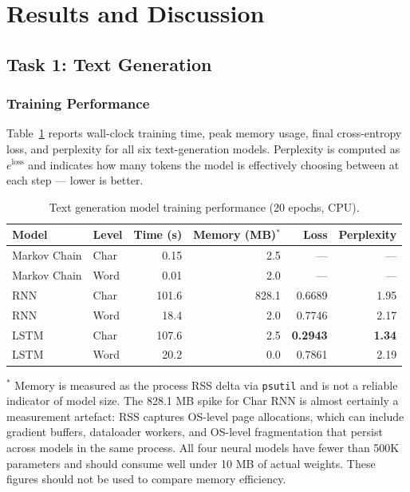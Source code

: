 \section{Results and Discussion}
\label{sec:results}

\subsection{Task 1: Text Generation}

\subsubsection*{Training Performance}

Table~\ref{tab:task1_training} reports wall-clock training time, peak memory usage,
final cross-entropy loss, and perplexity for all six text-generation models.
Perplexity is computed as $e^{\text{loss}}$ and indicates how many tokens the model
is effectively choosing between at each step — lower is better.

\begin{table}[H]
\centering
\caption{Text generation model training performance (20 epochs, CPU).}
\label{tab:task1_training}
\begin{tabular}{llrrrr}
\toprule
\textbf{Model} & \textbf{Level} & \textbf{Time (s)} & \textbf{Memory (MB)}$^*$ & \textbf{Loss} & \textbf{Perplexity} \\
\midrule
Markov Chain & Char & 0.15  & 2.5   & —      & —     \\
Markov Chain & Word & 0.01  & 2.0   & —      & —     \\
RNN          & Char & 101.6 & 828.1 & 0.6689 & 1.95  \\
RNN          & Word & 18.4  & 2.0   & 0.7746 & 2.17  \\
LSTM         & Char & 107.6 & 2.5   & \textbf{0.2943} & \textbf{1.34} \\
LSTM         & Word & 20.2  & 0.0   & 0.7861 & 2.19  \\
\bottomrule
\end{tabular}
\smallskip

\raggedright\footnotesize
$^*$ Memory is measured as the process RSS delta via \texttt{psutil} and is not
a reliable indicator of model size. The 828.1 MB spike for Char RNN is almost
certainly a measurement artefact: RSS captures OS-level page allocations, which
can include gradient buffers, dataloader workers, and OS-level fragmentation that
persist across models in the same process. All four neural models have
fewer than 500K parameters and should consume well under 10 MB of actual weights.
These figures should not be used to compare memory efficiency.
\end{table}

